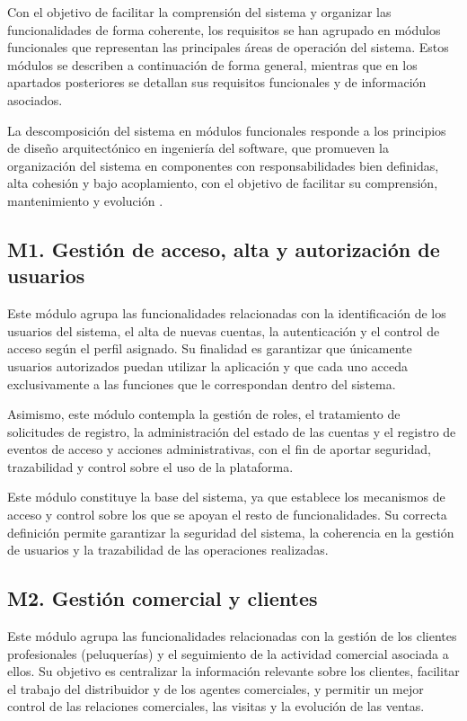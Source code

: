 Con el objetivo de facilitar la comprensión del sistema y organizar las funcionalidades de forma coherente, los requisitos se han agrupado en módulos funcionales que representan las principales áreas de operación del sistema. Estos módulos se describen a continuación de forma general, mientras que en los apartados posteriores se detallan sus requisitos funcionales y de información asociados.

La descomposición del sistema en módulos funcionales responde a los principios de diseño arquitectónico en ingeniería del software, que promueven la organización del sistema en componentes con responsabilidades bien definidas, alta cohesión y bajo acoplamiento, con el objetivo de facilitar su comprensión, mantenimiento y evolución \citep[Ch.~6--7]{sommerville}.

\subsection{M1. Gestión de acceso, alta y autorización de usuarios}

Este módulo agrupa las funcionalidades relacionadas con la identificación de los usuarios del sistema, el alta de nuevas cuentas, la autenticación y el control de acceso según el perfil asignado. Su finalidad es garantizar que únicamente usuarios autorizados puedan utilizar la aplicación y que cada uno acceda exclusivamente a las funciones que le correspondan dentro del sistema.

Asimismo, este módulo contempla la gestión de roles, el tratamiento de solicitudes de registro, la administración del estado de las cuentas y el registro de eventos de acceso y acciones administrativas, con el fin de aportar seguridad, trazabilidad y control sobre el uso de la plataforma.

Este módulo constituye la base del sistema, ya que establece los mecanismos de acceso y control sobre los que se apoyan el resto de funcionalidades. Su correcta definición permite garantizar la seguridad del sistema, la coherencia en la gestión de usuarios y la trazabilidad de las operaciones realizadas.

\subsection{M2. Gestión comercial y clientes}

Este módulo agrupa las funcionalidades relacionadas con la gestión de los clientes profesionales (peluquerías) y el seguimiento de la actividad comercial asociada a ellos. Su objetivo es centralizar la información relevante sobre los clientes, facilitar el trabajo del distribuidor y de los agentes comerciales, y permitir un mejor control de las relaciones comerciales, las visitas y la evolución de las ventas.

